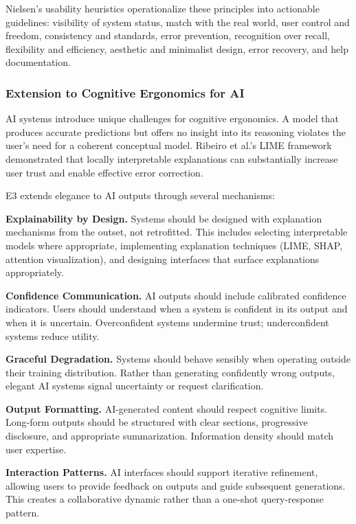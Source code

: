 \documentclass[11pt,a4paper]{article}
\begin{document}
Nielsen's usability heuristics \cite{nielsen1994enhancing} operationalize these principles into actionable guidelines: visibility of system status, match with the real world, user control and freedom, consistency and standards, error prevention, recognition over recall, flexibility and efficiency, aesthetic and minimalist design, error recovery, and help documentation.

\subsubsection{Extension to Cognitive Ergonomics for AI}

AI systems introduce unique challenges for cognitive ergonomics. A model that produces accurate predictions but offers no insight into its reasoning violates the user's need for a coherent conceptual model. Ribeiro et al.'s LIME framework \cite{ribeiro2016should} demonstrated that locally interpretable explanations can substantially increase user trust and enable effective error correction.

E3 extends elegance to AI outputs through several mechanisms:

\textbf{Explainability by Design.} Systems should be designed with explanation mechanisms from the outset, not retrofitted. This includes selecting interpretable models where appropriate, implementing explanation techniques (LIME, SHAP, attention visualization), and designing interfaces that surface explanations appropriately.

\textbf{Confidence Communication.} AI outputs should include calibrated confidence indicators. Users should understand when a system is confident in its output and when it is uncertain. Overconfident systems undermine trust; underconfident systems reduce utility.

\textbf{Graceful Degradation.} Systems should behave sensibly when operating outside their training distribution. Rather than generating confidently wrong outputs, elegant AI systems signal uncertainty or request clarification.

\textbf{Output Formatting.} AI-generated content should respect cognitive limits. Long-form outputs should be structured with clear sections, progressive disclosure, and appropriate summarization. Information density should match user expertise.

\textbf{Interaction Patterns.} AI interfaces should support iterative refinement, allowing users to provide feedback on outputs and guide subsequent generations. This creates a collaborative dynamic rather than a one-shot query-response pattern.
\end{document}
